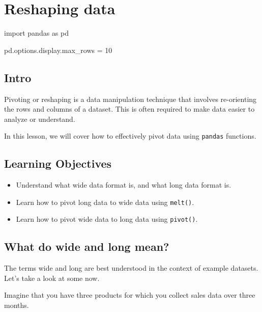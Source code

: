 \documentclass[
  letterpaper,
  DIV=11,
  numbers=noendperiod]{scrreprt}
\newenvironment{Shaded}{\begin{snugshade}}{\end{snugshade}}
\newcommand{\DecValTok}[1]{\textcolor[rgb]{0.68,0.00,0.00}{#1}}
\newcommand{\ImportTok}[1]{\textcolor[rgb]{0.00,0.46,0.62}{#1}}
\newcommand{\NormalTok}[1]{\textcolor[rgb]{0.00,0.23,0.31}{#1}}
\newcommand{\OperatorTok}[1]{\textcolor[rgb]{0.37,0.37,0.37}{#1}}
\providecommand{\tightlist}{%
  \setlength{\itemsep}{0pt}\setlength{\parskip}{0pt}}\usepackage{longtable,booktabs,array}
\begin{document}
\chapter{Reshaping data}\label{reshaping-data}

\begin{Shaded}
\begin{Highlighting}[]
\ImportTok{import}\NormalTok{ pandas }\ImportTok{as}\NormalTok{ pd}

\NormalTok{pd.options.display.max\_rows }\OperatorTok{=} \DecValTok{10}
\end{Highlighting}
\end{Shaded}

\section{Intro}\label{intro-4}

Pivoting or reshaping is a data manipulation technique that involves
re-orienting the rows and columns of a dataset. This is often required
to make data easier to analyze or understand.

In this lesson, we will cover how to effectively pivot data using
\texttt{pandas} functions.

\section{Learning Objectives}\label{learning-objectives-12}

\begin{itemize}
\tightlist
\item
  Understand what wide data format is, and what long data format is.
\item
  Learn how to pivot long data to wide data using \texttt{melt()}.
\item
  Learn how to pivot wide data to long data using \texttt{pivot()}.
\end{itemize}

\section{What do wide and long mean?}\label{what-do-wide-and-long-mean}

The terms wide and long are best understood in the context of example
datasets. Let's take a look at some now.

Imagine that you have three products for which you collect sales data
over three months.
\end{document}
